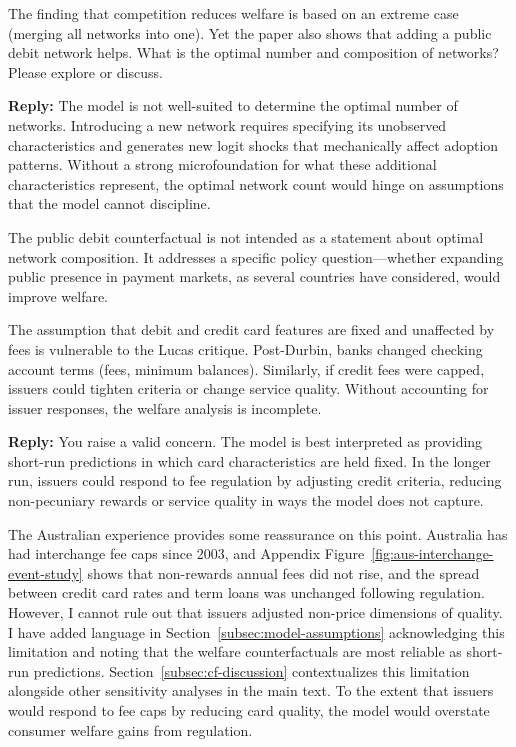 \documentclass[main.tex]{subfiles}
\begin{document}
\begin{refsection}
\begin{refcommentnoclear}
The finding that competition reduces welfare is based on an extreme case (merging all networks into one).
Yet the paper also shows that adding a public debit network helps.
What is the optimal number and composition of networks?
Please explore or discuss.

\end{refcommentnoclear}

\textbf{Reply:} The model is not well-suited to determine the optimal number of networks.
Introducing a new network requires specifying its unobserved characteristics and generates new logit shocks that mechanically affect adoption patterns.
Without a strong microfoundation for what these additional characteristics represent, the optimal network count would hinge on assumptions that the model cannot discipline.

The public debit counterfactual is not intended as a statement about optimal network composition.
It addresses a specific policy question---whether expanding public presence in payment markets, as several countries have considered, would improve welfare.

\begin{refcommentnoclear}
The assumption that debit and credit card features are fixed and unaffected by fees is vulnerable to the Lucas critique.
Post-Durbin, banks changed checking account terms (fees, minimum balances).
Similarly, if credit fees were capped, issuers could tighten criteria or change service quality.
Without accounting for issuer responses, the welfare analysis is incomplete.

\end{refcommentnoclear}

\textbf{Reply:} You raise a valid concern.
The model is best interpreted as providing short-run predictions in which card characteristics are held fixed.
In the longer run, issuers could respond to fee regulation by adjusting credit criteria, reducing non-pecuniary rewards or service quality in ways the model does not capture.

The Australian experience provides some reassurance on this point.
Australia has had interchange fee caps since 2003, and Appendix Figure~\ref{fig:aus-interchange-event-study} shows that non-rewards annual fees did not rise, and the spread between credit card rates and term loans was unchanged following regulation.
However, I cannot rule out that issuers adjusted non-price dimensions of quality.
I have added language in Section~\ref{subsec:model-assumptions} acknowledging this limitation and noting that the welfare counterfactuals are most reliable as short-run predictions.
Section~\ref{subsec:cf-discussion} contextualizes this limitation alongside other sensitivity analyses in the main text.
To the extent that issuers would respond to fee caps by reducing card quality, the model would overstate consumer welfare gains from regulation.

\printbibliography
\end{refsection}
\end{document}
